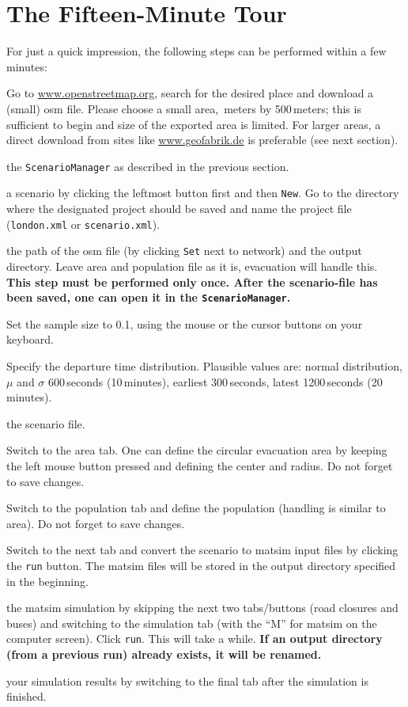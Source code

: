 \section{The Fifteen-Minute Tour}
\label{evac:section:fifteenminute}
For just a quick impression, the following steps can be performed within a few minutes:
\begin{description}\styleDescription
\item[OSM] Go to \url{www.openstreetmap.org}, search for the desired place and download a (small) \gls{osm} file. Please choose a small area, \,meters by 500\,meters; this is sufficient to begin and size of the exported area is limited. For larger areas, a direct download from sites like \url{www.geofabrik.de} is preferable (see next section).
\item[Run] the \lstinline|ScenarioManager| as described in the previous section.
\item[Create] a scenario by clicking the leftmost button first and then \lstinline|New|. Go to the directory where the designated project should be saved and name the project file (\eg \lstinline|london.xml| or \lstinline|scenario.xml|).
\item[Specify] the path of the \gls{osm} file (by clicking \lstinline|Set| next to network) and the output directory. Leave area and population file as it is, evacuation will handle this.
\textbf{This step must be performed only once. After the scenario-file has been saved, one can open it in the \lstinline|ScenarioManager|.}
\item[Sample size] Set the sample size to 0.1, using the mouse or the cursor buttons on your keyboard.
\item[Departure] Specify the departure time distribution. Plausible values are: normal distribution, $\mu$ and $\sigma$ 600\,seconds (10\,minutes), earliest 300\,seconds, latest 1200\,seconds (20\,minutes).
\item[Save] the scenario file.
\item[Area] Switch to the area tab. One can define the circular evacuation area by keeping the left mouse button pressed and defining the center and radius. Do not forget to save changes.
\item[Population] Switch to the population tab and define the population (handling is similar to area). Do not forget to save changes.
\item[Convert] Switch to the next tab and convert the scenario to \gls{matsim} input files by clicking the \lstinline|run| button. The \gls{matsim} files will be stored in the output directory specified in the beginning.
\item[Run] the \gls{matsim} simulation by skipping the next two tabs/buttons (road closures and buses) and switching to the simulation tab (with the 
 ``M'' for \gls{matsim} on the computer screen). Click \lstinline|run|. This will take a while.
\textbf{If an output directory (\eg from a previous run) already exists, it will be renamed.}
\item[Analyze] your simulation results by switching to the final tab after the simulation is finished.

\end{description}

